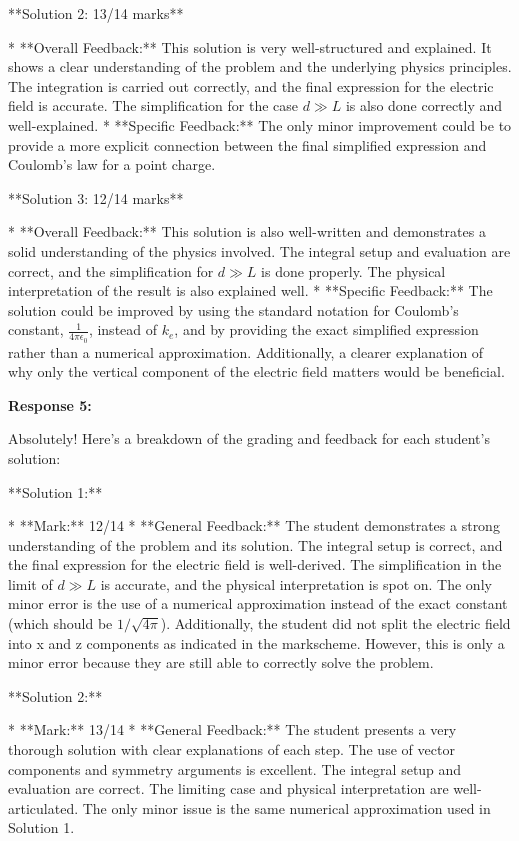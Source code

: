 \documentclass[a4paper,11pt]{article}
\begin{document}
**Solution 2: 13/14 marks**

* **Overall Feedback:**  This solution is very well-structured and explained. It shows a clear understanding of the problem and the underlying physics principles. The integration is carried out correctly, and the final expression for the electric field is accurate. The simplification for the case \(d \gg L\) is also done correctly and well-explained.
* **Specific Feedback:** The only minor improvement could be to provide a more explicit connection between the final simplified expression and Coulomb's law for a point charge.

**Solution 3: 12/14 marks**

* **Overall Feedback:** This solution is also well-written and demonstrates a solid understanding of the physics involved. The integral setup and evaluation are correct, and the simplification for \( d \gg L \) is done properly. The physical interpretation of the result is also explained well.
* **Specific Feedback:** The solution could be improved by using the standard notation for Coulomb's constant, \( \frac{1}{4\pi\epsilon_0} \), instead of \( k_e \), and by providing the exact simplified expression rather than a numerical approximation. Additionally, a clearer explanation of why only the vertical component of the electric field matters would be beneficial.


\textbf{Response 5:}

Absolutely! Here's a breakdown of the grading and feedback for each student's solution:

**Solution 1:**

* **Mark:** 12/14
* **General Feedback:** The student demonstrates a strong understanding of the problem and its solution. The integral setup is correct, and the final expression for the electric field is well-derived. The simplification in the limit of \(d \gg L\) is accurate, and the physical interpretation is spot on. The only minor error is the use of a numerical approximation instead of the exact constant (which should be \(1/\sqrt{4\pi}\)). Additionally, the student did not split the electric field into x and z components as indicated in the markscheme. However, this is only a minor error because they are still able to correctly solve the problem. 

**Solution 2:**

* **Mark:** 13/14
* **General Feedback:** The student presents a very thorough solution with clear explanations of each step. The use of vector components and symmetry arguments is excellent. The integral setup and evaluation are correct. The limiting case and physical interpretation are well-articulated. The only minor issue is the same numerical approximation used in Solution 1.
\end{document}
